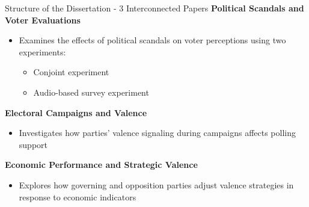 \documentclass[9pt, aspectratio=169]{beamer}
\begin{document}
\begin{frame}{Structure of the Dissertation - 3 Interconnected Papers}
    \textbf{Political Scandals and Voter Evaluations}  \vspace{0.2cm}
    \begin{itemize}
        \item Examines the effects of political scandals on voter perceptions using two experiments: \vspace{0.1cm}
        \begin{itemize}
            \item Conjoint experiment\vspace{0.1cm}
            \item Audio-based survey experiment
        \end{itemize}
    \end{itemize}
\vspace{0.3cm}
    \textbf{Electoral Campaigns and Valence}  \vspace{0.2cm}
    \begin{itemize}
        \item Investigates how parties’ valence signaling during campaigns affects polling support
    \end{itemize}
    \vspace{0.3cm}
    
    \textbf{Economic Performance and Strategic Valence}  \vspace{0.2cm}
    \begin{itemize}
        \item Explores how governing and opposition parties adjust valence strategies in response to economic indicators
    \end{itemize}
\end{frame}

\end{document}
